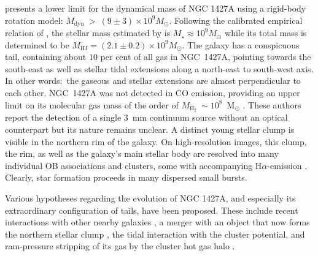 \citet{Chaname2000} presents a lower limit for the dynamical mass of NGC 1427A using a rigid-body rotation model: $M_{\mathrm{dyn}}~>~(9\pm 3)\times 10^9 M_\odot$. Following the calibrated empirical relation of \citet{Taylor2011}, the stellar mass estimated by \citet{Lee-Waddell2018} is $M_{\star} \approx 10^9 M_\odot$ while its total \Hi{} mass is determined to be $M_{\mathrm HI} = (2.1 \pm 0.2) \times 10^9 M_\odot$.
The galaxy has a conspicuous \Hi{} tail, containing about $10$ per cent of all \Hi{} gas in NGC~1427A, pointing towards the south-east as well as stellar tidal extensions along a north-east to south-west axis. In other words:~the gaseous and stellar extensions are almost perpendicular to each other. NGC~1427A was not detected in CO emission, providing an upper limit on its molecular gas mass of the order of $M_{\mathrm H_{2}}~\sim 10^8$~M$_\odot$ \citep{Zabel2019}. These authors report the detection of a single 3~mm continuum source without an optical counterpart but its nature remains unclear.
A distinct young stellar clump is visible in the northern rim of the galaxy. On high-resolution images, this clump, the rim, as well as the galaxy's main stellar body are resolved into many individual OB associations and clusters, some with accompanying H$\alpha$-emission \citep{Hilker1997, Sivanandam2014}. Clearly, star formation proceeds in many dispersed small bursts.

Various hypotheses regarding the evolution of NGC 1427A, and especially its extraordinary configuration of tails, have been proposed. These include recent interactions with other nearby galaxies \citep{Cellone1997}, a merger with an object that now forms the northern stellar clump \citep{Lee-Waddell2018}, the tidal interaction with the cluster potential, and ram-pressure stripping of its gas by the cluster hot gas halo \citep{Chaname2000, Mora2015}.

